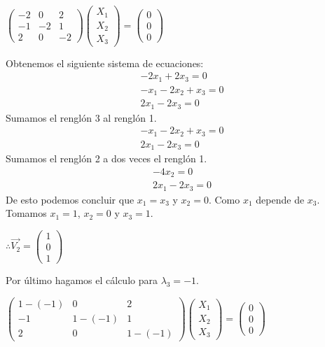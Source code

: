 \documentclass[letterpaper]{article}
\renewcommand{\*}{\cdot}
\theoremstyle{definition}
\begin{document}
	\begin{center}
		$\begin{pmatrix} -2 & 0 & 2 \\ -1 & -2 & 1 \\ 2 & 0 & -2  \end{pmatrix} \begin{pmatrix} X_{1} \\ X_{2} \\ X_{3} \end{pmatrix} = \begin{pmatrix} 0 \\ 0 \\ 0 \end{pmatrix}$
	\end{center}
	Obtenemos el siguiente sistema de ecuaciones:
	\begin{align*}
	-2x_{1} + 2x_{3} = 0\\
	-x_{1} -2x_{2} + x_{3}= 0\\
	2x_{1}-2x_{3}= 0
	\end{align*}
	Sumamos el renglón 3 al renglón 1.
	\begin{align*}
	-x_{1} -2x_{2} + x_{3}= 0\\
	2x_{1}-2x_{3}= 0
	\end{align*}
	Sumamos el renglón 2 a dos veces el renglón 1.
	\begin{align*}
    -4x_{2}= 0\\
	2x_{1}-2x_{3}= 0
	\end{align*}
	De esto podemos concluir que $x_{1} = x_{3}$ y $x_{2}= 0$. Como $x_{1}$ depende de $x_{3}$. Tomamos $x_{1} = 1$, $x_{2}=0$ y $x_{3}=1$.
	\begin{center}
		$\therefore \vec{V_{2}} = \begin{pmatrix} 1 \\ 0 \\ 1 \end{pmatrix}$
	\end{center}
	Por último hagamos el cálculo para $\lambda_{3}=-1$.
	\begin{center}
		$\begin{pmatrix} 1-(-1) & 0 & 2 \\ -1 & 1-(-1) & 1 \\ 2 & 0 & 1-(-1)  \end{pmatrix} \begin{pmatrix} X_{1} \\ X_{2} \\ X_{3} \end{pmatrix} = \begin{pmatrix} 0 \\ 0 \\ 0 \end{pmatrix}$
	\end{center}
\end{document}
